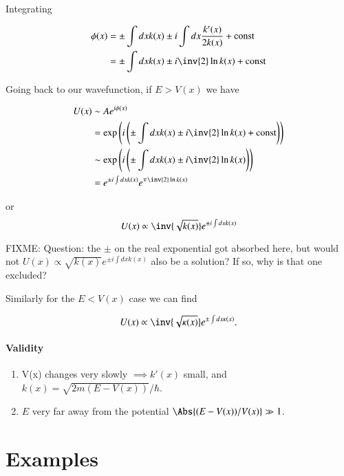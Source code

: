 Integrating

\begin{align*}
\phi(x) 
&= \pm \int dx k(x) \pm i \int dx \frac{k'(x)}{2 k(x)}  + \text{const} \\
&= \pm \int dx k(x) \pm i \inv{2} \ln k(x) + \text{const} 
\end{align*}

Going back to our wavefunction, if $E > V(x)$ we have

\begin{align*}
U(x) 
&\sim A e^{i \phi(x)} \\
&= \exp \left(i\left( 
\pm \int dx k(x) \pm i \inv{2} \ln k(x) + \text{const} 
\right)\right) \\
&\sim \exp \left(i\left( 
\pm \int dx k(x) \pm i \inv{2} \ln k(x) 
\right)\right) \\
&= e^{\pm i \int dx k(x)} e^{\mp \inv{2} \ln k(x)} \\
\end{align*}

or
\begin{equation}\label{eqn:qmTwoL12:350}
U(x) \propto \inv{\sqrt{k(x)}} e^{\pm i \int dx k(x)} 
\end{equation}

FIXME: Question: the $\pm$ on the real exponential got absorbed here, but would not $U(x) \propto \sqrt{k(x)} e^{\pm i \int dx k(x)}$ also be a solution?  If so, why is that one excluded?

Similarly for the $E < V(x)$ case we can find

\begin{equation}\label{eqn:qmTwoL12:370}
U(x) \propto \inv{\sqrt{\kappa(x)}} e^{\pm \int dx \kappa(x)}.
\end{equation}

\paragraph{Validity}
\begin{enumerate}
\item V(x) changes very slowly $\implies k'(x)$ small, and $k(x) = \sqrt{2 m (E - V(x))}/\hbar$.
\item $E$ very far away from the potential $\Abs{(E - V(x))/V(x)} \gg 1$.
\end{enumerate}

\section{Examples}

